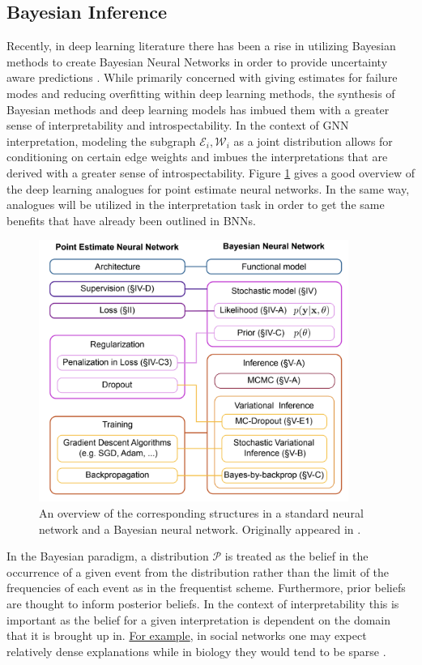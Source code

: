 \subsection{Bayesian Inference}
Recently, in deep learning literature there has been a rise in utilizing Bayesian methods to create Bayesian Neural Networks in order to provide uncertainty aware predictions \cite{jospin_hands-bayesian_2022}. While primarily concerned with giving estimates for failure modes and reducing overfitting within deep learning methods, the synthesis of Bayesian methods and deep learning models has imbued them with a greater sense of interpretability and introspectability. In the context of GNN interpretation, modeling the subgraph $\mathcal{E}_i, \mathcal{W}_i$ as a joint distribution allows for conditioning on certain edge weights and imbues the interpretations that are derived with a greater sense of introspectability. Figure \ref{fig:bnn_overview} gives a good overview of the deep learning analogues for point estimate neural networks. In the same way, analogues will be utilized in the interpretation task in order to get the same benefits that have already been outlined in BNNs.
\begin{figure}[t]
  \centering
  \includegraphics[width=0.9\textwidth]{images/bnn.jpeg}
  \caption{An overview of the corresponding structures in a standard neural network and a Bayesian neural network. Originally appeared in \cite{jospin_hands-bayesian_2022}.}
  \label{fig:bnn_overview}
\end{figure}
In the Bayesian paradigm, a distribution $\mathcal{P}$ is treated as the belief in the occurrence of a given event from the distribution rather than the limit of the frequencies of each event as in the frequentist scheme. Furthermore, prior beliefs are thought to inform posterior beliefs. In the context of interpretability this is important as the belief for a given interpretation is dependent on the domain that it is brought up in. \hyperref[fig:prior]{For example}, in social networks one may expect relatively dense explanations while in biology they would tend to be sparse \cite{cho_friendship_2011} \cite{petralia_new_2016}.
